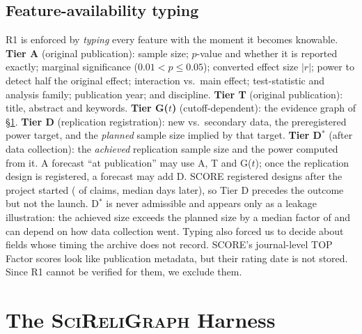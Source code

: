 \documentclass[conference]{IEEEtran}
\begin{document}
\subsection{Feature-availability typing}
R1 is enforced by \emph{typing} every feature with the moment it becomes knowable.
\textbf{Tier A} (original publication): sample size; $p$-value and whether it is reported exactly; marginal significance ($0.01<p\le0.05$); converted effect size $|r|$; power to detect half the original effect; interaction vs.\ main effect; test-statistic and analysis family; publication year; and discipline.
\textbf{Tier T} (original publication): title, abstract and keywords.
\textbf{Tier G($t$)} (cutoff-dependent): the evidence graph of \S\ref{sec:harness}.
\textbf{Tier D} (replication registration): new vs.\ secondary data, the preregistered power target, and the \emph{planned} sample size implied by that target.
\textbf{Tier D$^{*}$} (after data collection): the \emph{achieved} replication sample size and the power computed from it.
A forecast ``at publication'' may use A, T and G($t$); once the replication design is registered, a forecast may add D. SCORE registered designs after the project started (\regAfterStart{} of claims, median \regLagDays{} days later), so Tier D precedes the outcome but not the launch. D$^{*}$ is never admissible and appears only as a leakage illustration: the achieved size exceeds the planned size by a median factor of \plannedRatio{} and can depend on how data collection went. Typing also forced us to decide about fields whose timing the archive does not record. SCORE's journal-level TOP Factor scores look like publication metadata, but their rating date is not stored. Since R1 cannot be verified for them, we exclude them.

\section{The \textsc{SciReliGraph} Harness}\label{sec:harness}
\end{document}
